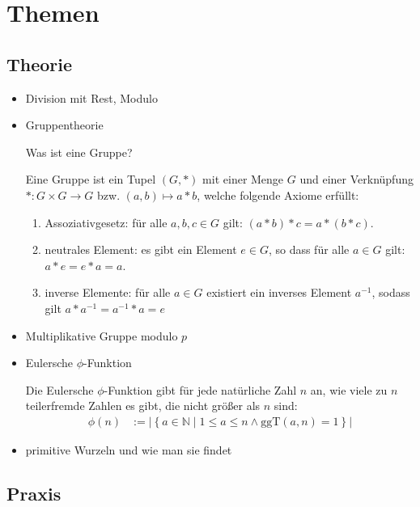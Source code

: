 \documentclass[
  a4paper,
  11pt,
]{article}
\title{}
\author{}
\newcommand{\N}{\mathbb{N}}
\newcommand{\ggT}{\text{ggT}}
\begin{document}
\section*{Themen}
\label{sec:Themen}

\subsection*{Theorie}
\label{sub:Theorie}

\begin{itemize}
  \item Division mit Rest, Modulo

  \item Gruppentheorie

    Was ist eine Gruppe?

      Eine Gruppe ist ein Tupel $(G, *)$ mit einer Menge $G$ und einer
      Verknüpfung $*: G \times G \to G$ bzw. $(a, b) \mapsto a * b$, welche
      folgende Axiome erfüllt:
      \begin{enumerate}
        \item Assoziativgesetz: für alle $a,b,c \in G$ gilt: $(a * b) * c = a
          * (b * c)$.
        \item neutrales Element: es gibt ein Element $e \in G$, so dass für
          alle $a \in G$ gilt: $a * e = e * a = a$.
        \item inverse Elemente: für alle $a \in G$ existiert ein inverses
          Element $a^{-1}$, sodass gilt $a * a^{-1} = a^{-1} * a = e$
      \end{enumerate}

  \item Multiplikative Gruppe modulo $p$

  \item Eulersche $\phi$-Funktion

    Die Eulersche $\phi$-Funktion gibt für jede natürliche Zahl $n$ an, wie
    viele zu $n$ teilerfremde Zahlen es gibt, die nicht größer als $n$ sind:
    \begin{align*}\label{eq:euler_phi_function_definition}
      \phi(n) & := \left|
        \left\{
          a \in \N \mid 1 \leq a \leq n \land \ggT(a, n) = 1
        \right\}
      \right|
    \end{align*}

  \item primitive Wurzeln und wie man sie findet
\end{itemize}

\subsection*{Praxis}
\label{sub:Praxis}
\end{document}
